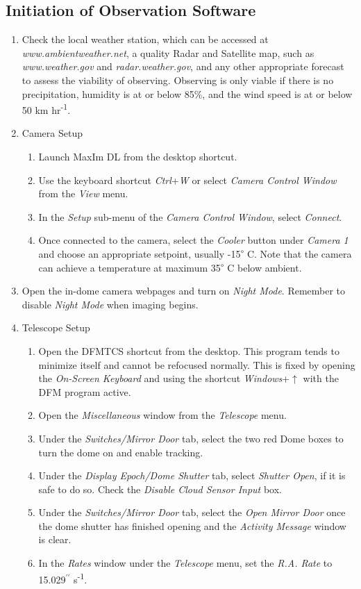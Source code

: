 \documentclass[letterpaper,12pt]{article}
\begin{document}
	\subsection{Initiation of Observation Software}
	\begin{enumerate}
		\item Check the local weather station, which can be accessed at \textit{www.ambientweather.net}, a quality Radar and Satellite map, such as \textit{www.weather.gov} and \textit{radar.weather.gov}, and any other appropriate forecast to assess the viability of observing. Observing is only viable if there is no precipitation, humidity is at or below 85\%, and the wind speed is at or below 50 km hr\textsuperscript{-1}.
		\item Camera Setup
		\begin{enumerate}
			\item Launch MaxIm DL from the desktop shortcut.
			\item Use the keyboard shortcut \textit{Ctrl}+\textit{W} or select \textit{Camera Control Window} from the \textit{View} menu.
			\item In the \textit{Setup} sub-menu of the \textit{Camera Control Window}, select \textit{Connect}.
			\item Once connected to the camera, select the \textit{Cooler} button under \textit{Camera 1} and choose an appropriate setpoint, usually -15\textsuperscript{$\circ$} C. Note that the camera can achieve a temperature at maximum 35\textsuperscript{$\circ$} C below ambient.
		\end{enumerate}
		\item Open the in-dome camera webpages and turn on \textit{Night Mode}. Remember to disable \textit{Night Mode} when imaging begins.
		\item Telescope Setup
		\begin{enumerate}
			\item Open the DFMTCS shortcut from the desktop. This program tends to minimize itself and cannot be refocused normally. This is fixed by opening the \textit{On-Screen Keyboard} and using the shortcut \textit{Windows}+$\uparrow$ with the DFM program active.
			\item Open the \textit{Miscellaneous} window from the \textit{Telescope} menu.
			\item Under the \textit{Switches/Mirror Door} tab, select the two red Dome boxes to turn the dome on and enable tracking.
			\item Under the \textit{Display Epoch/Dome Shutter} tab, select \textit{Shutter Open}, if it is safe to do so. Check the \textit{Disable Cloud Sensor Input} box.
			\item Under the \textit{Switches/Mirror Door} tab, select the \textit{Open Mirror Door} once the dome shutter has finished opening and the \textit{Activity Message} window is clear.
			\item In the \textit{Rates} window under the \textit{Telescope} menu, set the \textit{R.A. Rate} to 15.029$^{\prime\prime}$ s\textsuperscript{-1}.
		\end{enumerate}
	\end{enumerate}
	
\end{document}
